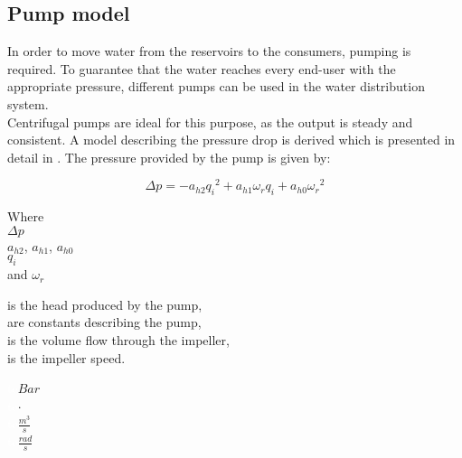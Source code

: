 \subsection{Pump model} 
\label{PumpModel}
In order to move water from the reservoirs to the consumers, pumping is required. To guarantee that the water reaches every end-user with the appropriate pressure, different pumps can be used in the water distribution system.\\
Centrifugal pumps are ideal for this purpose, as the output is steady and consistent. 
A model describing the pressure drop is derived which is presented in detail in \cite{Phd_Carsten}. The pressure provided by the pump is given by:

\begin{equation}
  \Delta p = -a_{h2}{q_i}^2 + a_{h1} \omega_r q_i + a_{h0}{\omega_r}^2
  \label{eq:PumpModel}
\end{equation}

\begin{minipage}[t]{0.20\textwidth}
Where\\
\hspace*{8mm} $\Delta p$ \\
\hspace*{8mm} $a_{h2}$, $a_{h1}$, $a_{h0}$ \\
\hspace*{8mm} $q_i$ \\
and \hspace*{0.7mm} $\omega_r$ 

\end{minipage}
\begin{minipage}[t]{0.68\textwidth}
\vspace*{2mm}
is the head produced by the pump,\\
are constants describing the pump,\\
is the volume flow through the impeller,\\
is the impeller speed.
\end{minipage}
\begin{minipage}[t]{0.10\textwidth}
\vspace*{2mm}
\textcolor{White}{te}$\unit{Bar}$\\
\textcolor{White}{te}$\unit{\cdot}$\\
\textcolor{White}{te}$\unit{\frac{m^3}{s}}$\\
\textcolor{White}{te}$\unit{\frac{rad}{s}}$
\end{minipage}	


